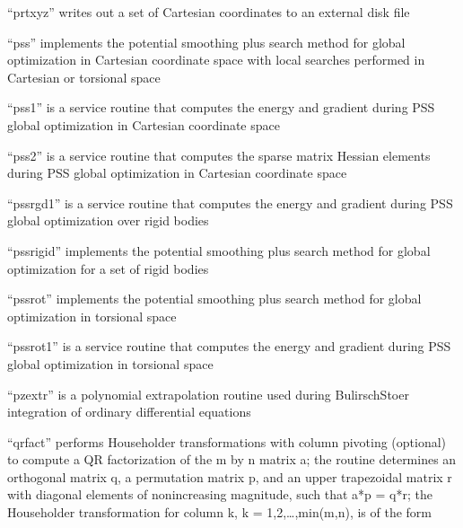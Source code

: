 \documentclass[letterpaper,11pt,english]{sphinxmanual}
\begin{document}

“prtxyz” writes out a set of Cartesian coordinates to an external disk file


“pss” implements the potential smoothing plus search method for global optimization in Cartesian coordinate space with local searches performed in Cartesian or torsional space


“pss1” is a service routine that computes the energy and gradient during PSS global optimization in Cartesian coordinate space


“pss2” is a service routine that computes the sparse matrix Hessian elements during PSS global optimization in Cartesian coordinate space


“pssrgd1” is a service routine that computes the energy and gradient during PSS global optimization over rigid bodies


“pssrigid” implements the potential smoothing plus search method for global optimization for a set of rigid bodies


“pssrot” implements the potential smoothing plus search method for global optimization in torsional space


“pssrot1” is a service routine that computes the energy and gradient during PSS global optimization in torsional space




“pzextr” is a polynomial extrapolation routine used during Bulirsch\sphinxhyphen{}Stoer integration of ordinary differential equations


“qrfact” performs Householder transformations with column pivoting (optional) to compute a QR factorization of the m by n matrix a; the routine determines an orthogonal matrix q, a permutation matrix p, and an upper trapezoidal matrix r with diagonal elements of nonincreasing magnitude, such that a*p = q*r; the Householder transformation for column k, k = 1,2,…,min(m,n), is of the form
\end{document}
